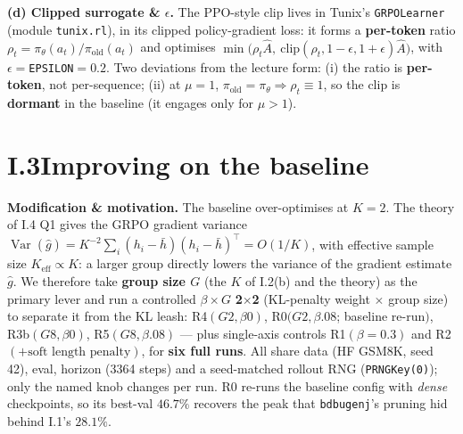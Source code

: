 \documentclass[11pt]{article}
\newcommand{\code}[1]{\texttt{#1}}
\begin{document}
\textbf{(d) Clipped surrogate \& $\epsilon$.} The PPO-style clip lives in Tunix's \code{GRPOLearner} (module \code{tunix.rl}), in its clipped policy-gradient loss: it forms a
\textbf{per-token} ratio $\rho_t{=}\pi_\theta(a_t)/\pi_{\mathrm{old}}(a_t)$ and optimises $\min\!\big(\rho_t\hat A,\ \mathrm{clip}(\rho_t,1{-}\epsilon,1{+}\epsilon)\hat A\big)$,
with $\epsilon{=}$\code{EPSILON}$=0.2$. Two deviations from the lecture form: (i) the ratio is \textbf{per-token}, not per-sequence; (ii) at
$\mu{=}1$, $\pi_{\mathrm{old}}{=}\pi_\theta\Rightarrow\rho_t\equiv1$, so the clip is \textbf{dormant} in the baseline (it engages only for $\mu>1$).

\section*{I.3\quad Improving on the baseline}
\textbf{Modification \& motivation.} The baseline over-optimises at $K{=}2$. The theory of I.4 Q1 gives the GRPO gradient variance
$\operatorname{Var}(\hat g)=K^{-2}\sum_i(h_i-\bar h)(h_i-\bar h)^\top=O(1/K)$, with effective sample size $K_{\mathrm{eff}}\!\propto\!K$: a larger
group directly lowers the variance of the gradient estimate $\hat g$. We therefore take \textbf{group size $G$} (the $K$ of I.2(b) and the theory) as the primary lever and run a controlled
$\beta\times G$ \textbf{2$\times$2} (KL-penalty weight $\times$ group size) to separate it from the KL leash:
R4$(G2,\beta0)$, R0$(G2,\beta.08$; baseline re-run$)$, R3b$(G8,\beta0)$, R5$(G8,\beta.08)$ --- plus single-axis controls R1$(\beta{=}0.3)$ and
R2$(+\text{soft length penalty})$, for \textbf{six full runs}. All share data (HF GSM8K, seed 42), eval, horizon (3364 steps) and a seed-matched
rollout RNG (\code{PRNGKey(0)}); only the named knob changes per run. R0 re-runs the baseline config with \emph{dense} checkpoints, so its best-val
$46.7\%$ recovers the peak that \code{bdbugenj}'s pruning hid behind I.1's $28.1\%$.
\end{document}
